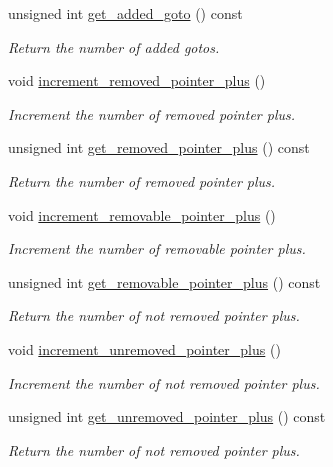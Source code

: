 \begin{DoxyCompactItemize}
unsigned int \hyperlink{classtree__manager_a367b3631b5e4af322d4ead5fdf56ec90}{get\+\_\+added\+\_\+goto} () const
\begin{DoxyCompactList}\small\item\em Return the number of added gotos. \end{DoxyCompactList}\item 
void \hyperlink{classtree__manager_a8921dd1183c3686833783e59f0a6e956}{increment\+\_\+removed\+\_\+pointer\+\_\+plus} ()
\begin{DoxyCompactList}\small\item\em Increment the number of removed pointer plus. \end{DoxyCompactList}\item 
unsigned int \hyperlink{classtree__manager_a3872777bd3609bf9bfdcbdb7bc2ea7ca}{get\+\_\+removed\+\_\+pointer\+\_\+plus} () const
\begin{DoxyCompactList}\small\item\em Return the number of removed pointer plus. \end{DoxyCompactList}\item 
void \hyperlink{classtree__manager_a8aed89986e2d2d949dfdddea890d4c35}{increment\+\_\+removable\+\_\+pointer\+\_\+plus} ()
\begin{DoxyCompactList}\small\item\em Increment the number of removable pointer plus. \end{DoxyCompactList}\item 
unsigned int \hyperlink{classtree__manager_aa80a54972baf7c38ccd78afd3ea9dc73}{get\+\_\+removable\+\_\+pointer\+\_\+plus} () const
\begin{DoxyCompactList}\small\item\em Return the number of not removed pointer plus. \end{DoxyCompactList}\item 
void \hyperlink{classtree__manager_adca72df6457b16922fd0c82fea5ff221}{increment\+\_\+unremoved\+\_\+pointer\+\_\+plus} ()
\begin{DoxyCompactList}\small\item\em Increment the number of not removed pointer plus. \end{DoxyCompactList}\item 
unsigned int \hyperlink{classtree__manager_ad886cc521171a9ca11fc2ece77ab0e33}{get\+\_\+unremoved\+\_\+pointer\+\_\+plus} () const
\begin{DoxyCompactList}\small\item\em Return the number of not removed pointer plus. \end{DoxyCompactList}\item 

\end{DoxyCompactItemize}
